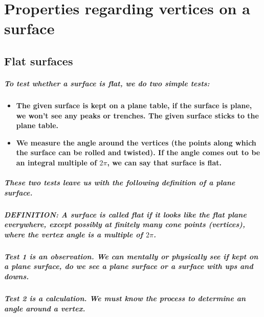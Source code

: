 \documentclass{report}
\begin{document}
\appendix

\chapter{Properties regarding vertices on a surface}

\section{Flat surfaces}

\paragraph{To test whether a surface is flat, we do two simple tests:}

\begin{itemize}
\item \textbf{The given surface is kept on a plane table, if the surface is plane, we won’t see any peaks or trenches. The given surface sticks to the plane table.}

\item \textbf{ We measure the angle around the vertices (the points along which the surface can be rolled and twisted). If the angle comes out to be an integral multiple of $2\pi$, we can say that surface is flat.}
\end{itemize}

\paragraph{These two tests leave us with the following definition of a plane surface.}



\paragraph{\textit{DEFINITION}: A surface is called flat if it looks like the flat plane everywhere, except possibly at finitely many cone points (vertices), where the vertex angle is a multiple of $2\pi$.}

\paragraph{Test 1 is an observation. We can mentally or physically see if kept on a plane surface, do we see a plane surface or a surface with ups and downs.}

\paragraph{Test 2 is a calculation. We must know the process to determine an angle around a vertex.}
\end{document}
